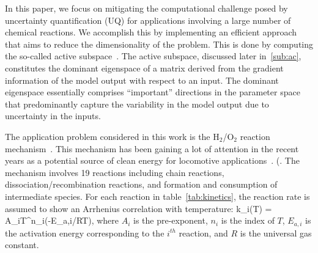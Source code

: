 In this paper, we focus on mitigating the computational challenge
posed by uncertainty quantification (UQ) for applications involving a large
number of chemical reactions. We accomplish this by implementing
an efficient approach that aims to reduce the dimensionality of the problem. This is
done by
computing the so-called active subspace~\cite{Constantine:2015}.  The active
subspace, discussed later in~\ref{sub:ac}, constitutes the dominant
eigenspace of a matrix derived from the gradient information of the model
output with respect to an input. The dominant eigenspace essentially comprises
``important'' directions in the parameter space that predominantly capture the
variability in the model output due to uncertainty in the inputs. 

The application problem considered in this work is the
H$_2$/O$_2$ reaction mechanism~\cite{Yetter:1991}. This mechanism has been
gaining a lot of attention in the recent years as a potential source of clean
energy for locomotive applications~\cite{Das:1996}. (.   
The mechanism involves 19
reactions including chain reactions, dissociation/recombination reactions, and
formation and consumption of intermediate species. For each reaction in
table~\ref{tab:kinetics}, the reaction rate is assumed to show an Arrhenius
correlation with temperature:
%
\be
k_i(T) = A_iT^{n_i}\exp(-E_{a,i}/RT), 
\label{eq:rate}
\ee
%
where $A_i$ is the pre-exponent, $n_i$ is the index of $T$, $E_{a,i}$ is the
activation energy corresponding to the $i^{th}$ reaction, and $R$ is the
universal gas constant.  

